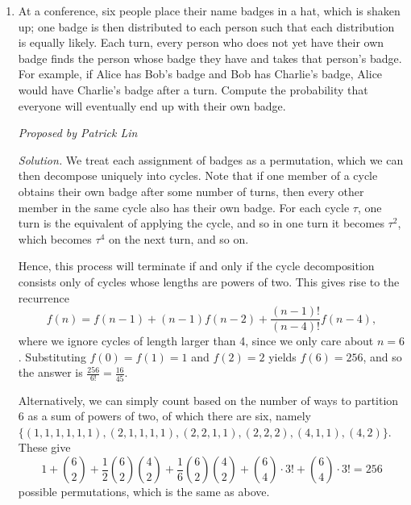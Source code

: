 \documentclass[10pt]{article}
\newcounter{enum}
\newcommand{\proposed}[1]
{
\vspace{5pt}
\noindent\textit{Proposed by #1}
}
\newcommand{\solution}
{
\vspace{5pt}
\noindent\textit{Solution.}\qquad
}
\begin{document}
\begin{enumerate}
\item At a conference, six people place their name badges in a hat, which is shaken up; one badge is then distributed to each person such that each distribution is equally likely. Each turn, every person who does not yet have their own badge finds the person whose badge they have and takes that person's badge. For example, if Alice has Bob's badge and Bob has Charlie's badge, Alice would have Charlie's badge after a turn. Compute the probability that everyone will eventually end up with their own badge.

\proposed{Patrick Lin}

\solution We treat each assignment of badges as a permutation, which we can then decompose uniquely into cycles. Note that if one member of a cycle obtains their own badge after some number of turns, then every other member in the same cycle also has their own badge. For each cycle $\tau$, one turn is the equivalent of applying the cycle, and so in one turn it becomes $\tau^2$, which becomes $\tau^4$ on the next turn, and so on.

\par Hence, this process will terminate if and only if the cycle decomposition consists only of cycles whose lengths are powers of two. This gives rise to the recurrence
\[f(n) = f(n-1) + (n-1)f(n-2) + \frac{(n-1)!}{(n-4)!} f(n-4),\]
where we ignore cycles of length larger than 4, since we only care about $n = 6$. Substituting $f(0) = f(1) = 1$ and $f(2) = 2$ yields $f(6) = 256$, and so the answer is $\frac{256}{6!} = \boxed{\tfrac{16}{45}}$.

\par Alternatively, we can simply count based on the number of ways to partition 6 as a sum of powers of two, of which there are six, namely $\{(1,1,1,1,1,1),(2,1,1,1,1),(2,2,1,1),(2,2,2),(4,1,1),(4,2)\}$. These give
\[1 + \binom62 + \frac12\binom62\binom42 + \frac16\binom62\binom42 + \binom64\cdot3! + \binom64\cdot3! = 256\]
possible permutations, which is the same as above.





\setcounter{enum}{\theenumi}
\end{enumerate}
\end{document}

